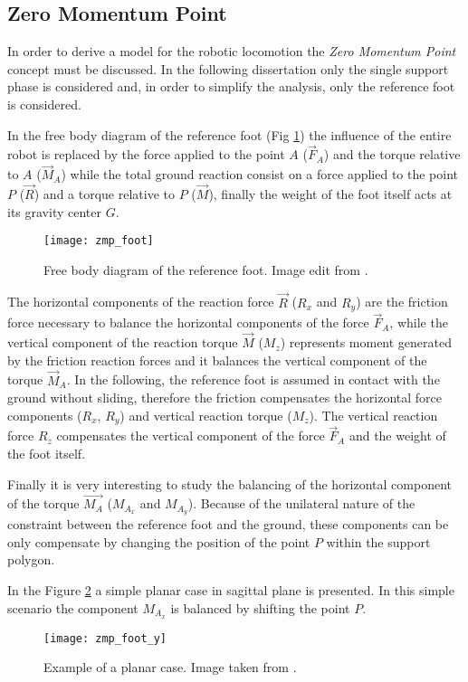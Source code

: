 \subsection{Zero Momentum Point}
In order to derive a model for the robotic locomotion the \emph{Zero Momentum Point} concept
\cite{Vukobratovic1969} must be discussed.
In the following dissertation only the single support phase is considered and, in order to simplify the analysis, only the reference foot is considered.
\par
In the free body diagram of the reference foot (Fig \ref{fig:zmp_foot}) the influence of the
entire robot is replaced by the force applied to the point $A$
($\vec{F}_A$) and the torque relative to $A$ ($\vec{M}_A$) while the
total ground reaction consist on a force applied to the point $P$ ($\vec{R}$) and a torque
relative to $P$ ($\vec{M}$), finally the weight of the foot itself acts at its gravity center $G$.
\begin{figure}[!ht]
  \centering
  \texttt{[image: zmp\_foot]}
  \caption{Free body diagram of the reference foot. Image edit from \cite{Vukobratov2004}. \label{fig:zmp_foot}}
\end{figure}
\par
The horizontal components of the reaction force $\vec{R}$ ($R_x$ and $R_y$) are 
the friction force necessary to balance the horizontal components of the force $\vec{F}_A$, while
the vertical component of the reaction torque $\vec{M}$ ($M_z$) represents moment generated by the
friction reaction forces and it balances the vertical component of the torque $\vec{M}_A$.
In the following, the reference foot is assumed in contact with the ground without sliding, therefore
the friction compensates the horizontal force components ($R_x$, $R_y$) and vertical reaction torque
($M_z$). The vertical reaction force $R_z$ compensates the vertical component of the force
$\vec{F}_A$ and the weight of the foot itself.  
\par
Finally it is very interesting to study the balancing of the horizontal component of the
torque $\vec{M_A}$ ($M_{A_x}$ and $M_{A_y}$). Because of the unilateral nature of the constraint between
the reference foot and the ground, these components can be only compensate by changing
the position of the point $P$ within the support polygon.
\par
In the Figure \ref{fig:zmp_foot_y} a simple planar case in sagittal plane is presented. In this
simple scenario the component $M_{A_x}$ is balanced by shifting the point $P$.
\begin{figure}[!ht]
  \centering
  \texttt{[image: zmp\_foot\_y]}
  \caption{Example of a planar case. Image taken from \cite{Vukobratov2004}. \label{fig:zmp_foot_y}}
\end{figure}

